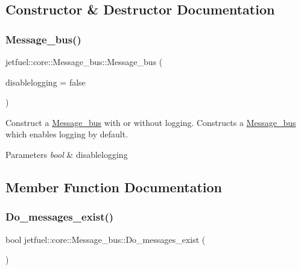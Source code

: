\subsection{Constructor \& Destructor Documentation}
\mbox{\label{classjetfuel_1_1core_1_1Message__bus_abf8b94890bd7223f9fa3f7d861ee96ab}} 
\subsubsection{\texorpdfstring{Message\+\_\+bus()}{Message\_bus()}}
{\footnotesize\ttfamily jetfuel\+::core\+::\+Message\+\_\+bus\+::\+Message\+\_\+bus (\begin{DoxyParamCaption}\item[{const bool}]{disablelogging = {\ttfamily false} }\end{DoxyParamCaption})}



Construct a \hyperlink{classjetfuel_1_1core_1_1Message__bus}{Message\+\_\+bus} with or without logging. Constructs a \hyperlink{classjetfuel_1_1core_1_1Message__bus}{Message\+\_\+bus} which enables logging by default. 


\begin{DoxyParams}{Parameters}
{\em bool} & disablelogging \\
\hline
\end{DoxyParams}


\subsection{Member Function Documentation}
\mbox{\label{classjetfuel_1_1core_1_1Message__bus_a81015af8f393e028c4e9e670167aa013}} 
\subsubsection{\texorpdfstring{Do\+\_\+messages\+\_\+exist()}{Do\_messages\_exist()}}
{\footnotesize\ttfamily bool jetfuel\+::core\+::\+Message\+\_\+bus\+::\+Do\+\_\+messages\+\_\+exist (\begin{DoxyParamCaption}{ }\end{DoxyParamCaption})\hspace{0.3cm}{\ttfamily [inline]}}



